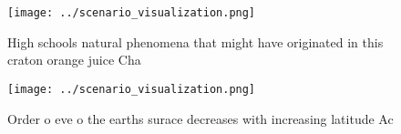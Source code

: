 \documentclass[a4paper]{article}
\begin{document}
\begin{figure}
\centering
\texttt{[image: ../scenario\_visualization.png]}
\caption{High schools natural phenomena that might have originated in this craton orange juice Cha
}
\end{figure}
 
\begin{figure}
\centering
\texttt{[image: ../scenario\_visualization.png]}
\caption{Order o eve o the earths surace decreases with increasing latitude Ac
}
\end{figure}
 
\end{document}
